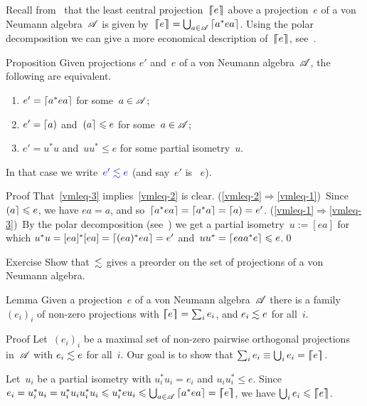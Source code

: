 \documentclass[a]{subfiles}
\begin{document}
\begin{parsec}%
\begin{point}%
Recall from~
that the least central projection~$\left\lceil\!\!\left\lceil e\right\rceil\!\!\right\rceil$
above a projection~$e$ of a von Neumann algebra~$\mathscr{A}$
is given by~$\left\lceil\!\!\left\lceil e\right\rceil\!\!\right\rceil=\bigcup_{a\in \mathscr{A}}\left\lceil a^* e a\right\rceil$.
Using the polar decomposition
we can give a more economical
description of~$\left\lceil\!\!\left\lceil e\right\rceil\!\!\right\rceil$,
see~.
\end{point}
\begin{point}[vmleq]{Proposition}%
Given projections $e'$ and~$e$
of a von Neumann algebra~$\mathscr{A}$,
the following are equivalent.
\begin{enumerate}
\item
\label{vmleq-1}
$e'= \left\lceil a^*e a\right\rceil$ for some~$a\in\mathscr{A}$;
\item
\label{vmleq-2}
$e' = \left\lceil a\right)$ and~$\left(a\right\rceil\leqslant e$
for some~$a\in\mathscr{A}$;
\item
\label{vmleq-3}
$e' = u^*u$ and~$uu^*\leq e$
for some partial isometry~$u$.
\end{enumerate}
In that case
we write~$\Define{e'\vmleq e}$
(and say~$e'$ is ~$e$).
\begin{point}{Proof}%
That~\ref{vmleq-3}
implies~\ref{vmleq-2} is clear.
(\ref{vmleq-2}$\Rightarrow$\ref{vmleq-1})\ 
Since~$\left(a\right\rceil\leqslant e$,
we have $ea=a$,
and so~$\left\lceil a^*ea\right\rceil=\left\lceil a^*a\right\rceil=\left\lceil a\right)=e'$.
(\ref{vmleq-1}$\Rightarrow$\ref{vmleq-3})\ 
By the polar decomposition (see~)
we get a partial isometry~$u:=[ea]$
for which $u^*u = [ea]^*[ea]=\left\lceil(ea)^*ea\right\rceil=e'$
and~$uu^*=\left\lceil eaa^*e\right\rceil\leqslant e$.\qed
\end{point}
\end{point}
\begin{point}{Exercise}%
Show that~$\vmleq$ gives a preorder
on the set of projections of a von Neumann algebra.
\end{point}
\begin{point}{Lemma}%
Given a projection~$e$
of a von Neumann algebra~$\mathscr{A}$
there is a family
$(e_i)_i$ of non-zero projections with $\left\lceil\!\!\left\lceil e\right\rceil\!\!\right\rceil=\sum_i e_i$,
and $e_i\vmleq e$ for all~$i$.
\begin{point}{Proof}%
Let~$(e_i)_i$
be a maximal set of non-zero pairwise orthogonal projections
in~$\mathscr{A}$ with
$e_i\vmleq e$ for all~$i$.
Our goal is to show that $\sum_i e_i \equiv \bigcup_i e_i=\left\lceil\!\!\left\lceil e\right\rceil\!\!\right\rceil$.

Let~$u_i$ be a partial isometry
with $u_i^*u_i=e_i$ and $u_iu_i^* \leq e$.
Since $e_i=u_i^* u_i = u_i^* u_i u_i^* u_i
\leqslant u_i^* e u_i 
\leqslant \bigcup_{a\in \mathscr{A}} \left\lceil a^* e a\right\rceil=\left\lceil\!\!\left\lceil e\right\rceil\!\!\right\rceil$,
we have
$\bigcup_i e_i \leqslant \left\lceil\!\!\left\lceil e\right\rceil\!\!\right\rceil$.


\end{point}
\end{point}
\end{parsec}
\end{document}
